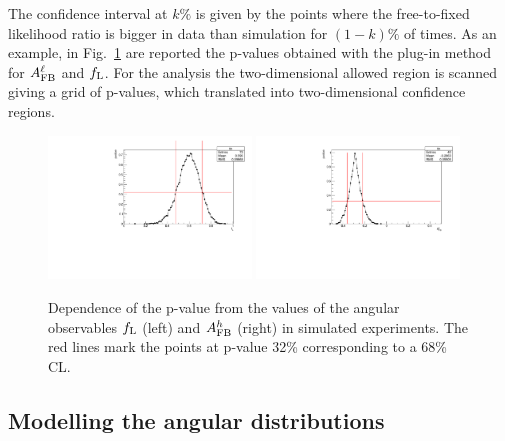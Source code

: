 The confidence interval at $k\%$ is given by the points where the free-to-fixed likelihood ratio is bigger in data than
simulation for $(1-k)\%$ of times. As an example, in Fig.~\ref{fig:FCexample} are reported the p-values obtained
with the plug-in method for $A_{\rm FB}^\ell$ and $f_{\rm L}$. For the analysis the two-dimensional allowed region 
is scanned giving a grid of p-values, which translated into two-dimensional confidence regions.
%
\begin{figure}[h!]
\centering
\includegraphics[width=0.48\textwidth]{Lmumu/figs/pvalue_fL_1500_2000.pdf}
\includegraphics[width=0.48\textwidth]{Lmumu/figs/pvalue_afbB_1500_2000.pdf}
\caption{ Dependence of the p-value from the values of the angular observables $f_{\rm L}$ (left) 
and $A_{\rm FB}^h$ (right) in simulated experiments. The red lines mark the points
at p-value 32\% corresponding to a 68\% CL.}
\label{fig:FCexample}
\end{figure}

\subsection{Modelling the angular distributions}
\label{sec:angfit}

